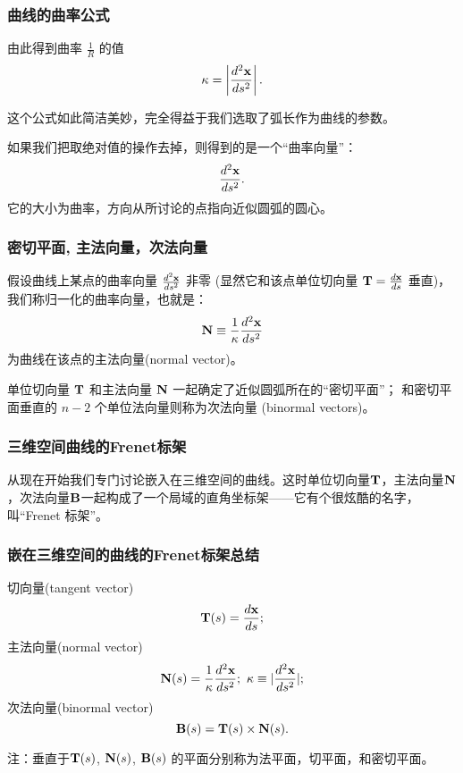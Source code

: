 \documentclass[CJK,13pt]{beamer}
\begin{document}
\begin{frame}
  \frametitle{曲线的曲率公式}
  由此得到曲率 $\frac{1}{R}$ 的值
  {\blue
  $$\kappa =  \left\vert\frac{d^2{\mathbf{x}}}{ds^2}\right\vert. $$}

  这个公式如此简洁美妙，完全得益于我们选取了弧长作为曲线的参数。

  \skipline
  
  如果我们把取绝对值的操作去掉，则得到的是一个“曲率向量”：
  $$\frac{d^2{\mathbf{x}}}{ds^2}. $$
  它的大小为曲率，方向从所讨论的点指向近似圆弧的圆心。  


\end{frame}


\begin{frame}
  \frametitle{密切平面, 主法向量，次法向量}
  假设曲线上某点的曲率向量 $\frac{d^2{\mathbf{x}}}{ds^2}$ 非零 (显然它和该点单位切向量 ${\mathbf{T}} = \frac{d{\mathbf{x}}}{ds}$ 垂直)， 
  我们称归一化的曲率向量，也就是：
  $$ {\mathbf{N}} \equiv \frac{1}{\kappa} \frac{d^2{\mathbf{x}}}{ds^2}$$
  为曲线在该点的{\blue 主法向量}(normal vector)。


  单位切向量 ${\mathbf{T}}$ 和主法向量 ${\mathbf{N}}$ 一起确定了近似圆弧所在的“{\blue 密切平面}”； 和密切平面垂直的 $n-2$ 个单位法向量则称为{\blue 次法向量} (binormal vectors)。
  
\end{frame}

\begin{frame}
  \frametitle{三维空间曲线的Frenet标架}


  从现在开始我们专门讨论嵌入在三维空间的曲线。这时单位切向量${\mathbf{T}}$，主法向量${\mathbf{N}}$，次法向量${\mathbf{B}}$一起构成了一个局域的直角坐标架——它有个很炫酷的名字，叫“{\blue Frenet 标架}”。  

  

\end{frame}


\begin{frame}
  \frametitle{嵌在三维空间的曲线的Frenet标架总结}  
  切向量(tangent vector)
  $${\mathbf{T}}(s) = \frac{d{\mathbf{x}}}{ds};$$
  主法向量(normal vector)
  $${\mathbf{N}}(s) = \frac{1}{\kappa}\frac{d^2{\mathbf{x}}}{ds^2};\ \kappa \equiv \lvert\frac{d^2{\mathbf{x}}}{ds^2}\rvert;$$
  次法向量(binormal vector)
  $${\mathbf{B}}(s) = {\mathbf{T}}(s)\times {\mathbf{N}}(s).$$

  {\scriptsize 注：垂直于${\mathbf{T}}(s)$, ${\mathbf{N}}(s)$, ${\mathbf{B}}(s)$ 的平面分别称为法平面，切平面，和密切平面。}
\end{frame}
\end{document}
